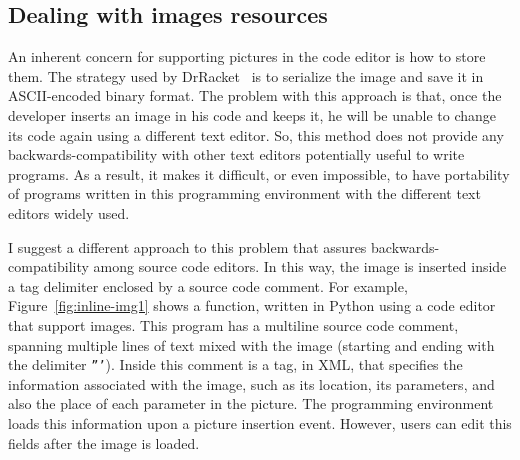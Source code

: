 \subsection{Dealing with images resources}

An inherent concern for supporting pictures in the code editor is how to store them. The strategy used by DrRacket~\citep{findler2002drscheme} is to serialize the image and save it in ASCII-encoded binary format. The problem with this approach is that, once the developer inserts an image in his code and keeps it, he will be unable to change its code again using a different text editor. So, this method does not provide any backwards-compatibility with other text editors potentially useful to write programs. As a result, it makes it difficult, or even impossible, to have portability of programs written in this programming environment with the different text editors widely used.

I suggest a different approach to this problem that assures backwards-compatibility among source code editors. In this way, the image is inserted inside a tag delimiter enclosed by a source code comment. For example, Figure~\ref{fig:inline-img1} shows a function, written in Python using a code editor that support images. This program has a  multiline source code comment, spanning multiple lines of text mixed with the image (starting and ending with the delimiter \texttt{'''}). Inside this comment is a tag, in XML, that specifies the information associated with the image, such as its location, its parameters, and also the place of each parameter in the picture. The programming environment loads this information upon a picture insertion event. However, users can edit this fields after the image is loaded.

